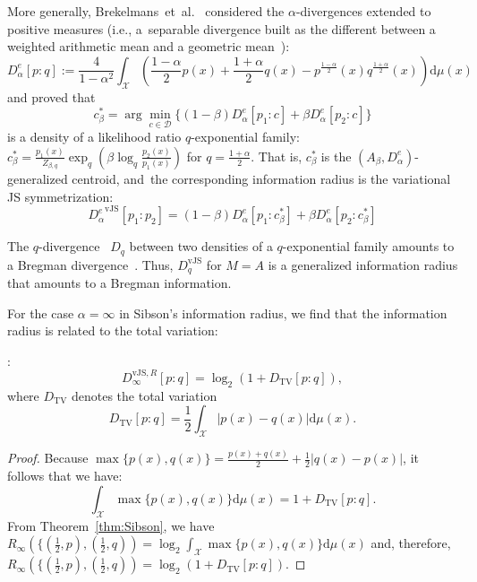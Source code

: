\documentclass[entropy,article,accept,oneauthor,pdftex,entropy]{Definitions/mdpi}
\def\TV{\mathrm{TV}}
\def\vJS{\mathrm{vJS}}
\def\dmu{\mathrm{d}\mu}
\def\calD{\mathcal{D}}
\def\calX{\mathcal{X}}
\def\dmu{\mathrm{d}\mu}
\begin{document}
\begin{paracol}{2}
\begin{Example}
More generally, Brekelmans~et~al.~\cite{AISqpath-2020} considered the $\alpha$-divergences extended to positive measures  (i.e., a~separable divergence built as the different between a weighted arithmetic mean and a geometric mean~\cite{nielsen2020generalization}):
\begin{equation}
D_\alpha^e[p:q] := \frac{4}{1-\alpha^2} \int_\calX \left(\frac{1-\alpha}{2} p(x)+\frac{1+\alpha}{2} q(x)
- p^{{\frac{1-\alpha}{2}}}(x)q^{{\frac{1+\alpha}{2}}}(x)
\right) \dmu(x)
\end{equation}
and proved that
\begin{equation}
c^*_\beta = \arg\min_{c\in\calD} \{(1-\beta)D_\alpha^e[p_1:c]+\beta D_\alpha^e[p_2:c]\}
\end{equation}
is a density of a likelihood ratio $q$-exponential family: $c^*_\beta= \frac{p_1(x)}{Z_{\beta,q}} \exp_q(\beta \log_q \frac{p_2(x)}{p_1(x)})$ for $q=\frac{1+\alpha}{2}$.
That is, $c^*_\beta$ is the  $(A_\beta,D_\alpha^e)$-generalized centroid, and~the corresponding information radius is the variational JS symmetrization:
\begin{equation}
{D_\alpha^e}^\vJS[p_1:p_2]=(1-\beta)D_\alpha^e[p_1:c^*_\beta]+\beta D_\alpha^e[p_2:c^*_\beta]
\end{equation}
\end{Example}

\begin{Example}
The $q$-divergence~\cite{AmariOhara-2011} $D_q$ between two densities of a $q$-exponential family amounts to a Bregman divergence~\cite{AmariOhara-2011,IG-2016}.
Thus, $D_q^\vJS$ for $M=A$ is a generalized information radius that amounts to a Bregman information.
\end{Example}

 
For the case $\alpha=\infty$ in Sibson's information radius, we find that the information radius is related to the total variation:
\begin{Proposition}:
\begin{equation}
D^{\vJS,R}_\infty[p:q]=\log_2 (1+D_\TV[p:q]),
\end{equation}
where $D_\TV$ denotes the total variation
\begin{equation}
D_\TV[p:q]=\frac{1}{2}\int_\calX |p(x)-q(x)| \dmu(x).
\end{equation}
\end{Proposition}

\begin{proof}
Because $\max\{p(x),q(x)\}=\frac{p(x)+q(x)}{2}+\frac{1}{2}|q(x)-p(x)|$, it follows that we have:
$$
\int_\calX \max\{p(x),q(x)\}\dmu(x)=1+D_\TV[p:q].
$$
From Theorem~\ref{thm:Sibson}, we have $R_\infty(\{(\frac{1}{2},p),(\frac{1}{2},q))=\log_2 \int_\calX \max\{p(x),q(x)\}\dmu(x)$ and,
therefore, $R_\infty(\{(\frac{1}{2},p),(\frac{1}{2},q))=\log_2\left(1+D_\TV[p:q]\right)$.
\end{proof}



\end{paracol}
\end{document}
